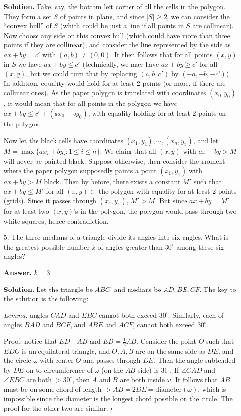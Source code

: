 \documentclass[11pt,a4paper]{article}
\begin{document}
\begin{enumerate}
	\textbf{Solution.} Take, say, the bottom left corner of all the cells in the polygon. 
	They form a set $S$ of points in plane, 
	and since $|S|\ge 2$, 
	we can consider the ``convex hull'' of $S$ 
	(which could be just a line if all points in $S$ are collinear). 
	Now choose any side on this convex hull 
	(which could have more than three points if they are collinear), 
	and consider the line represented by the side as $ax+by=c'$ with $(a, b)\neq (0, 0)$. 
	It then follows that for all points $(x, y)$ in $S$ we have $ax+by\le c'$
	(technically, we may have $ax+by\ge c'$ for all $(x, y)$, 
	but we could turn that by replacing $(a, b, c')$ by $(-a, -b, -c')$). 
	In addition, equality would hold for at least 2 points (or more, if there are collinear ones). 
	As the paper polygon is translated with coordinates $(x_0, y_0)$, 
	it would mean that for all points in the polygon we have $ax+by\le c'+(ax_0+by_0)$, 
	with equality holding for at least 2 points on the polygon. 
	
	Now let the black cells have coordinates $(x_1, y_1), \cdots, (x_n, y_n)$, 
	and let $M=\max\{ax_i+by_i: 1\le i\le n\}$. 
	We claim that all $(x, y)$ with $ax+by>M$ will never be painted black. 
	Suppose otherwise, then consider the moment where the paper polygon supposedly paints a point $(x_1, y_1)$ with $ax+by>M$ black. 
	Then by before, there exists a constant $M'$ such that $ax+by\le M'$ for all $(x, y)\in$ the polygon with equality for at least 2 points (grids). 
	Since it passes through $(x_1, y_1)$, $M' > M$. 
	But since $ax+by=M'$ for at least two $(x, y)$'s in the polygon, 
	the polygon would pass through two white squares, hence contradiction. 
	
	\item[5.]
	The three medians of a triangle divide its angles into six angles. What is the greatest possible
	number $k$ of angles greater than $30^{\circ}$ among these six angles?
	
	\textbf{Answer.} $k=3$. 
	
	\textbf{Solution.} 
	Let the triangle be $ABC$, and medians be $AD, BE, CF$. 
	The key to the solution is the following: 
	
	\emph{Lemma.} angles $CAD$ and $EBC$ cannot both exceed $30^{\circ}$. 
	Similarly, each of angles $BAD$ and $BCF$, and $ABE$ and $ACF$, cannot both exceed $30^{\circ}$. 
	
	Proof: notice that $ED\parallel AB$ and $ED=\frac 12 AB$. 
	Consider the point $O$ such that $EDO$ is an equilateral triangle, and $O, A, B$ are on the same side as $DE$, 
	and the circle $\omega$ with center $O$ and passes through $DE$. 
	Then the angle subtended by $DE$ on to circumference of $\omega$ (on the $AB$ side) is $30^{\circ}$. 
	If $\angle CAD$ and $\angle EBC$ are both $>30^{\circ}$, 
	then $A$ and $B$ are both inside $\omega$. 
	It follows that $AB$ must be on some chord of length $>AB=2DE=\text{diameter}(\omega)$, 
	which is impossible since the diameter is the longest chord possible on the circle. 
	The proof for the other two are similar. 
	$\square$
	

\end{enumerate}
\end{document}
